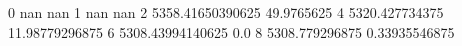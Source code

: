 0 nan nan
1 nan nan
2 5358.41650390625 49.9765625
4 5320.427734375 11.98779296875
6 5308.43994140625 0.0
8 5308.779296875 0.33935546875
